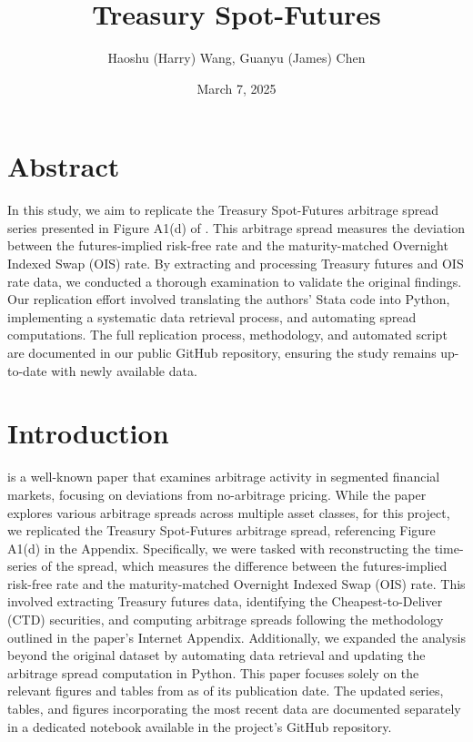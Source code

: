 \documentclass{article}
\title{Treasury Spot-Futures}
\author{Haoshu (Harry) Wang, Guanyu (James) Chen}
\date{March 7, 2025}
\begin{document}
\maketitle
\section{Abstract}

In this study, we aim to replicate the Treasury Spot-Futures arbitrage spread series presented in Figure A1(d) of \cite{siriwardane2023segmented}. This arbitrage spread measures the deviation between the futures-implied risk-free rate and the maturity-matched Overnight Indexed Swap (OIS) rate. By extracting and processing Treasury futures and OIS rate data, we conducted a thorough examination to validate the original findings. Our replication effort involved translating the authors' Stata code into Python, implementing a systematic data retrieval process, and automating spread computations. The full replication process, methodology, and automated script are documented in our public GitHub repository, ensuring the study remains up-to-date with newly available data.

\section{Introduction}

\cite{siriwardane2023segmented} is a well-known paper that examines arbitrage activity in segmented financial markets, focusing on deviations from no-arbitrage pricing. While the paper explores various arbitrage spreads across multiple asset classes, for this project, we replicated the Treasury Spot-Futures arbitrage spread, referencing Figure A1(d) in the Appendix. Specifically, we were tasked with reconstructing the time-series of the spread, which measures the difference between the futures-implied risk-free rate and the maturity-matched Overnight Indexed Swap (OIS) rate. This involved extracting Treasury futures data, identifying the Cheapest-to-Deliver (CTD) securities, and computing arbitrage spreads following the methodology outlined in the paper’s Internet Appendix. Additionally, we expanded the analysis beyond the original dataset by automating data retrieval and updating the arbitrage spread computation in Python. This paper focuses solely on the relevant figures and tables from \cite{siriwardane2023segmented} as of its publication date. The updated series, tables, and figures incorporating the most recent data are documented separately in a dedicated notebook available in the project's GitHub repository.
\end{document}
